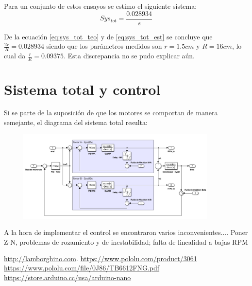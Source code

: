 \documentclass[10pt,conference,a4paper,onecolumn]{article}%
\begin{document}
Para un conjunto de estos ensayos se estimo el siguiente sistema:
\begin{equation}
Sys_{tot}= \frac{0.028934}{s}  
\label{eq:sys_tot_est}
\end{equation}

De la ecuación \ref{eq:sys_tot_teo} y de \ref{eq:sys_tot_est}  se concluye que $\frac{2r}{R}=0.028934 $ siendo que los parámetros medidos son $r=1.5cm$ y $R=16cm$, lo cual da $\frac{r}{R}=0.09375 $. Esta discrepancia no se pudo explicar aún.   

\section{Sistema total y control}

Si se parte de la suposición de que los motores se comportan de manera semejante, el diagrama del sistema total resulta:


\begin{figure}[h]
\centering
\includegraphics[width=10cm]{./imagenes/sistema_total}
\caption{}
\end{figure}


A la hora de implementar el control se encontraron varios inconvenientes.... Poner Z-N, problemas de rozamiento y de inestabilidad; falta de linealidad a bajas RPM


\begin{thebibliography}{X}
 \url{http://lamborghino.com}. 
\url{https://www.pololu.com/product/3061}
\url{ https://www.pololu.com/file/0J86/TB6612FNG.pdf}
 \url{https://store.arduino.cc/usa/arduino-nano}
\end{thebibliography}
\end{document}
